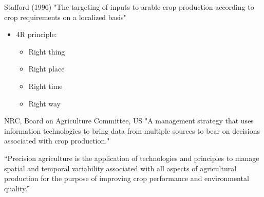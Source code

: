 \documentclass[11pt,dvipsnames,ignorenonframetext,aspectratio=169]{beamer}
\providecommand{\tightlist}{%
  \setlength{\itemsep}{0pt}\setlength{\parskip}{0pt}}
\begin{document}
\begin{frame}{}
\protect\hypertarget{section-2}{}
\begin{block}{Stafford (1996)}
"The targeting of inputs to arable crop production according to crop requirements on a localized basis"
\end{block}

\begin{itemize}
\tightlist
\item
  4R principle:

  \begin{itemize}
  \tightlist
  \item
    Right thing
  \item
    Right place
  \item
    Right time
  \item
    Right way
  \end{itemize}
\end{itemize}

\begin{block}{NRC, Board on Agriculture Committee, US}
"A management strategy that uses information technologies to bring data from multiple sources to bear on decisions associated with crop production."
\end{block}

``Precision agriculture is the application of technologies and
principles to manage spatial and temporal variability associated with
all aspects of agricultural production for the purpose of improving crop
performance and environmental quality.''
\end{frame}
\end{document}
